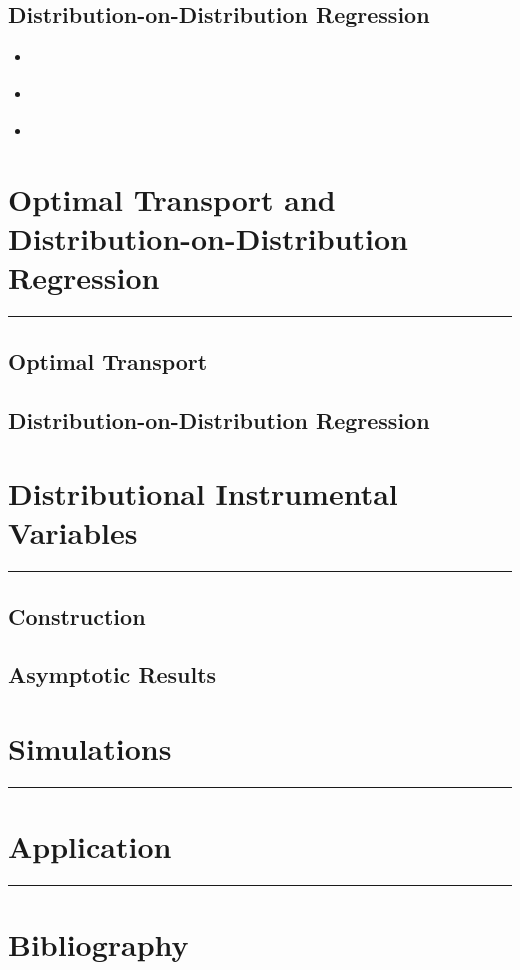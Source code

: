 \documentclass[letterpaper,10pt]{article}
\begin{document}
\subsection*{Distribution-on-Distribution Regression}
\begin{multicols}{2}
    \begin{itemize}
        \item \cite{ghodrati_distribution--distribution_2021}
        \item \cite{ghodrati_minimax_2022}
        \item \cite{ghodrati_transportation_2023}
    \end{itemize}
\end{multicols}

\section{Optimal Transport and Distribution-on-Distribution Regression}
\hrule

\subsection*{Optimal Transport}

\subsection*{Distribution-on-Distribution Regression}

\section{Distributional Instrumental Variables}
\hrule

\subsection*{Construction}

\subsection*{Asymptotic Results}

\section{Simulations}
\hrule

\section{Application}
\hrule

\newpage
\section{Bibliography}
\printbibliography

\appendix
\end{document}
